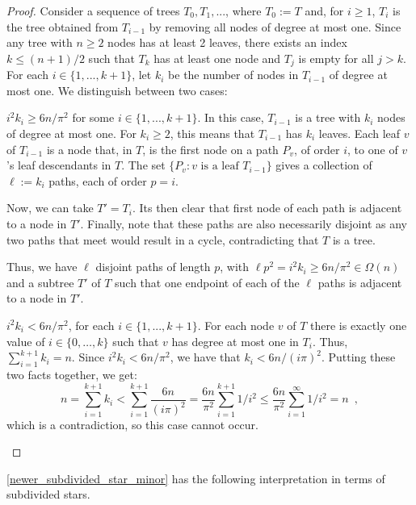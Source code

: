 \documentclass[12pt]{article}
\renewcommand{\ge}{\geqslant}
\renewcommand{\le}{\leqslant}
\theoremstyle{plain}
\theoremstyle{definition}
\begin{document}
\begin{proof}
Consider a sequence of trees $T_0, T_1, ...$, where $T_0:=T$ and, for $i \ge 1$, $T_i$ is the tree obtained from $T_{i-1}$ by removing all nodes of degree at most one. Since any tree with $n \ge 2$ nodes has at least 2 leaves, there exists an index $k \le (n+1)/2$ such that $T_k$ has at least one node and $T_j$ is empty for all $j > k$. For each $i \in \{1,...,k+1\}$, let $k_i$ be the number of nodes in $T_{i-1}$ of degree at most one. We distinguish between two cases:

\begin{compactenum}[(1)]
    \item $i^2k_i \ge 6n/\pi^2$ for some $i \in \{1,...,k+1\}$. In this case, $T_{i-1}$ is a tree with $k_i$ nodes of degree at most one.  For $k_i\ge 2$, this means that $T_{i-1}$ has $k_i$ leaves.  Each leaf $v$ of $T_{i-1}$ is a node that, in $T$, is the first node on a path $P_v$, of order $i$, to one of $v$'s leaf descendants in $T$.  The set $\{P_v:\text{$v$ is a leaf $T_{i-1}$}\}$ gives a collection of $\ell:=k_i$ paths, each of order $p=i$. 

    Now, we can take $T'=T_i$. Its then clear that first node of each path is adjacent to a node in $T'$. Finally, note that these paths are also necessarily disjoint as any two paths that meet would result in a cycle, contradicting that $T$ is a tree.

    Thus, we have $\ell$ disjoint paths of length $p$, with $\ell p^2 = i^2k_i \ge 6n/\pi^2 \in \Omega(n)$ and a subtree $T'$ of $T$ such that one endpoint of each of the $\ell$ paths is adjacent to a node in $T'$. 

    \item $i^2k_i < 6n/\pi^2$, for each $i \in \{1,...,k+1\}$.  For each node $v$ of $T$ there is exactly one value of $i\in\{0,\ldots,k\}$ such that $v$ has degree at most one in $T_i$.
    Thus, $\sum_{i=1}^{k+1} k_i = n$. Since $i^2k_i < 6n/\pi^2$, we have that  $k_i < 6n/(i\pi)^2$.  Putting these two facts together, we get:
   \[
    n = \sum_{i=1}^{k+1} k_i < \sum_{i=1}^{k+1} \frac{6n}{(i\pi)^2} = \frac{6n}{\pi^2}\sum_{i=1}^{k+1}1/i^2 \le \frac{6n}{\pi^2}\sum_{i=1}^{\infty}1/i^2 = n \enspace , \]
    which is a contradiction, so this case cannot occur.
\end{compactenum} 
\end{proof}

\cref{newer_subdivided_star_minor} has the following interpretation in terms of subdivided stars.
\end{document}
